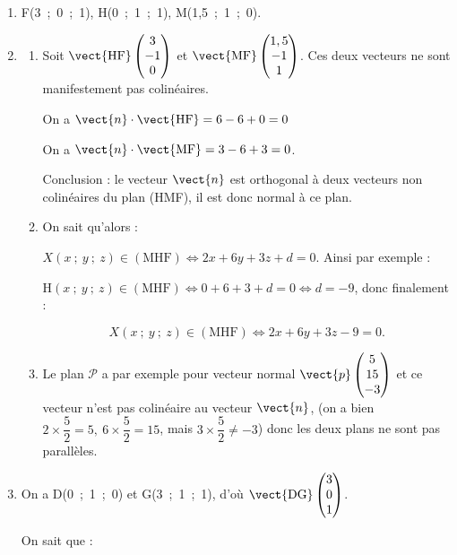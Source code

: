 \begin{enumerate}
\item 
F(3~;~0~;~1), \: H(0~;~1~;~1), \:M(1,5~;~1~;~0).
\item 
	\begin{enumerate}
		\item 
	
Soit $\vect{\text{HF}}\begin{pmatrix}3\\-1\\0\end{pmatrix}$ et $\vect{\text{MF}}\begin{pmatrix}1,5\\-1\\1\end{pmatrix}$. Ces deux vecteurs ne sont manifestement pas colinéaires.

On a $\vect{n} \cdot \vect{\text{HF}} = 6 - 6 + 0 = 0$

On a $\vect{n} \cdot \vect{\text{MF}} = 3 - 6 + 3 = 0$.

Conclusion : le vecteur $\vect{n}$ est orthogonal à deux vecteurs non colinéaires du plan  (HMF), il est donc normal à ce plan.
		\item 
On sait qu'alors :

$X(x~;~y~;~z) \in  (\text{MHF}) \iff 2x + 6y + 3z + d = 0$. Ainsi par exemple :

$\text{H}(x~;~y~;~z) \in  (\text{MHF}) \iff 0 + 6 + 3 + d = 0 \iff d = - 9$, donc finalement :

\[X(x~;~y~;~z) \in  (\text{MHF}) \iff 2x + 6y + 3z - 9 = 0.\]
		\item 
Le plan $\mathcal{P}$ a par exemple pour vecteur normal $\vect{p}\begin{pmatrix}5\\15\\-3\end{pmatrix}$ et ce vecteur n'est pas colinéaire au vecteur $\vect{n}$, (on a bien $2 \times \dfrac52 = 5, \: 6 \times \dfrac52 = 15$, mais $3 \times \dfrac52 \ne - 3$)  donc les deux plans ne sont pas parallèles.
	\end{enumerate}
\item 
On a D(0~;~1~;~0) et G(3~;~1~;~1), d'où $\vect{\text{DG}}\begin{pmatrix}3\\0\\1\end{pmatrix}$.

On sait que :


\end{enumerate}
